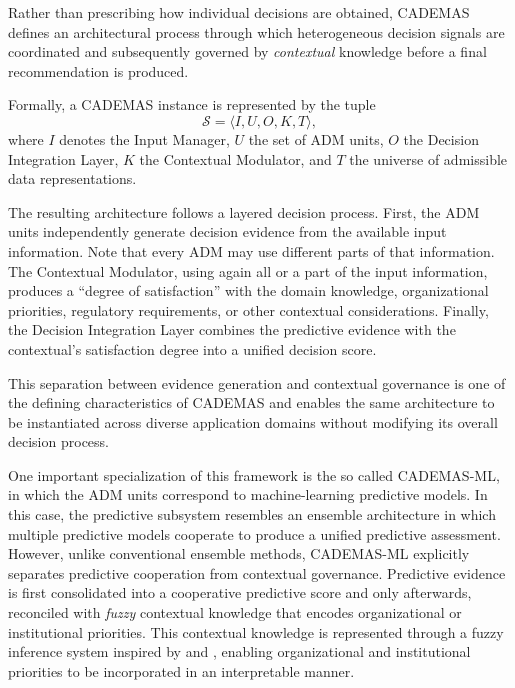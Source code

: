 \documentclass[mathematics,article,submit,moreauthors]{Definitions/mdpi}
\begin{document}
Rather than prescribing how individual decisions are obtained, CADEMAS defines an architectural process through which heterogeneous decision signals are coordinated and subsequently governed by \textit{contextual} knowledge before a final recommendation is produced.

Formally, a CADEMAS instance is represented by the tuple
\begin{equation}
\mathcal{S}=
\langle I, U, O, K, T \rangle,
\end{equation}
where $I$ denotes the Input Manager, $U$ the set of ADM units, $O$ the Decision Integration Layer, $K$ the Contextual Modulator, and $T$ the universe of admissible data representations. %

The resulting architecture follows a layered decision process. First, the ADM units independently generate decision evidence from the available input information. Note that every ADM may use different parts of that information. 
The Contextual Modulator, using again all or a part of the input information, produces a ``degree of satisfaction'' with the domain knowledge, organizational priorities, regulatory requirements, or other contextual considerations. 
Finally, the Decision Integration Layer combines the predictive evidence with the contextual's satisfaction degree into a unified decision score. 

This separation between evidence generation and contextual governance is one of the defining characteristics of CADEMAS and enables the same architecture to be instantiated across diverse application domains without modifying its overall decision process.

One important specialization of this framework is the so called CADEMAS-ML, in which the ADM units correspond to machine-learning predictive models. In this case, the predictive subsystem resembles an ensemble architecture in which multiple predictive models cooperate to produce a unified predictive assessment. However, unlike conventional ensemble methods, CADEMAS-ML explicitly separates predictive cooperation from contextual governance. Predictive evidence is first consolidated into a cooperative predictive score and only afterwards, reconciled with \textit{fuzzy} contextual knowledge that encodes organizational or institutional priorities. {\color{blue} This contextual knowledge is represented through a fuzzy inference system inspired by  \citet{PerezCanedo2022} and \citet{PerezCanedo2024}, enabling organizational and institutional priorities to be incorporated in an interpretable manner.}
\end{document}
